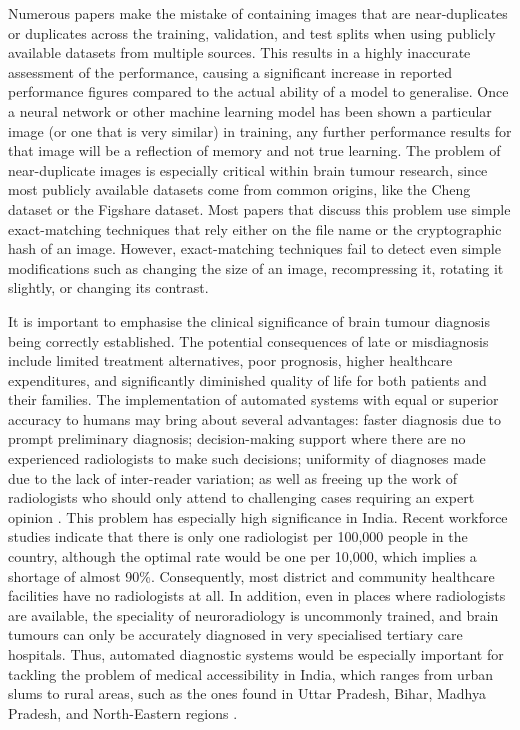 \documentclass[final,3p,times,number]{elsarticle}
\begin{document}
Numerous papers make the mistake of containing images that are near-duplicates or duplicates across the training, validation, and test splits when using publicly available datasets from multiple sources. This results in a highly inaccurate assessment of the performance, causing a significant increase in reported performance figures compared to the actual ability of a model to generalise. Once a neural network or other machine learning model has been shown a particular image (or one that is very similar) in training, any further performance results for that image will be a reflection of memory and not true learning. The problem of near-duplicate images is especially critical within brain tumour research, since most publicly available datasets come from common origins, like the Cheng dataset or the Figshare dataset. Most papers that discuss this problem use simple exact-matching techniques that rely either on the file name or the cryptographic hash of an image. However, exact-matching techniques fail to detect even simple modifications such as changing the size of an image, recompressing it, rotating it slightly, or changing its contrast.

It is important to emphasise the clinical significance of brain tumour diagnosis being correctly established. The potential consequences of late or misdiagnosis include limited treatment alternatives, poor prognosis, higher healthcare expenditures, and significantly diminished quality of life for both patients and their families. The implementation of automated systems with equal or superior accuracy to humans may bring about several advantages: faster diagnosis due to prompt preliminary diagnosis; decision-making support where there are no experienced radiologists to make such decisions; uniformity of diagnoses made due to the lack of inter-reader variation; as well as freeing up the work of radiologists who should only attend to challenging cases requiring an expert opinion \cite{ref13,ref14}. This problem has especially high significance in India. Recent workforce studies indicate that there is only one radiologist per 100,000 people in the country, although the optimal rate would be one per 10,000, which implies a shortage of almost 90\%. Consequently, most district and community healthcare facilities have no radiologists at all. In addition, even in places where radiologists are available, the speciality of neuroradiology is uncommonly trained, and brain tumours can only be accurately diagnosed in very specialised tertiary care hospitals. Thus, automated diagnostic systems would be especially important for tackling the problem of medical accessibility in India, which ranges from urban slums to rural areas, such as the ones found in Uttar Pradesh, Bihar, Madhya Pradesh, and North-Eastern regions \cite{ref27}.
\end{document}
